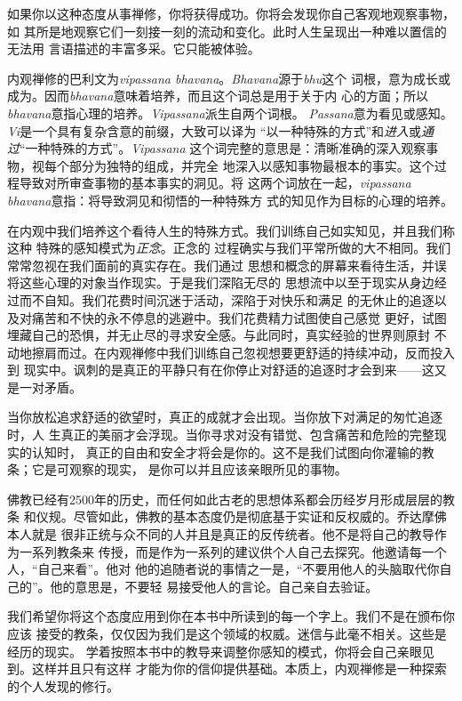 如果你以这种态度从事禅修，你将获得成功。你将会发现你自己客观地观察事物，如
其所是地观察它们一刻接一刻的流动和变化。此时人生呈现出一种难以置信的无法用
言语描述的丰富多采。它只能被体验。

内观禅修的巴利文为{\it vipassana bhavana}。{\it Bhavana}源于{\it bhu}这个
词根，意为成长或成为。因而{\it bhavana}意味着培养，而且这个词总是用于关于内
心的方面；所以{\it bhavana}意指心理的培养。{\it Vipassana}派生自两个词根。
{\it Passana}意为看见或感知。{\it Vi}是一个具有复杂含意的前缀，大致可以\1译为
“以一种特殊的方式”和{\it 进入}或{\it 通过}“一种特殊的方式”。{\it Vipassana}%
这个词完整的意思是：清晰准确的深入观察事物，视每个部分为独特的组成，并完全
地深入以感知事物最根本的事实。这个过程导致对所审查事物的基本事实的洞见。将
这两个词放在一起，{\it vipassana bhavana}意指：将导致洞见和彻悟的一种特殊方
式的知见作为目标的心理的培养。

在内观中我们培养这个看待人生的特殊方式。我们训练自己如实知见，并且我们称这种
特殊的感知模式为{\it 正念}。正念的
过程确实与我们平常所做的大不相同。我们常常忽视在我们面前的真实存在。我们通过
思想和概念的屏幕来看待生活，并误将这些心理的对象当作现实。于是我们深陷无尽的
思想流中以至于现实从身边经过而不自知。我们花费时间沉迷于活动，深陷于对快乐和满足
的无休止的追逐以及对痛苦和不快的永不停息的逃避中。我们花费精力试图使自己感觉
更好，试图埋藏自己的恐惧，并无止尽的寻求安全感。与此同时，真实经验的世界则原封
不动地擦肩而过。在内观禅修中我们训练自己忽视想要更舒适的持续冲动，反而投入到
现实中。讽刺的是真正的平静只有在你停止对舒适的追逐时才会到来——这又是一对矛盾。

当你放松追求舒适的欲望时，真正的成就才会出现。当你放下对满足的匆忙追逐时，人
生真正的美丽才会浮现。当你寻求对没有错觉、包含痛苦和危险的完整现实的认知时，
真正的自由和安全才将会是你的。这不是我们试图向你灌输的教条；它是可观察的现实，
是你可以并且应该亲眼所见的事物。

\1佛教已经有2500年的历史，而任何如此古老的思想体系都会历经岁月形成层层的教条
和仪规。尽管如此，佛教的基本态度仍是彻底基于实证和反权威的。乔达摩佛本人就是
很非正统与众不同的人并且是真正的反传统者。他不是将自己的教导作为一系列教条来
传授，而是作为一系列的建议供个人自己去探究。他邀请每一个人，“自己来看”。他对
他的追随者说的事情之一是，“不要用他人的头脑取代你自己的”。他的意思是，不要轻
易接受他人的言论。自己亲自去验证。

我们希望你将这个态度应用到你在本书中所读到的每一个字上。我们不是在颁布你应该
接受的教条，仅仅因为我们是这个领域的权威。迷信与此毫不相关。这些是经历的现实。
学着按照本书中的教导来调整你感知的模式，你将会自己亲眼见到。这样并且只有这样
才能为你的信仰提供基础。本质上，内观禅修是一种探索的个人发现的修行。

